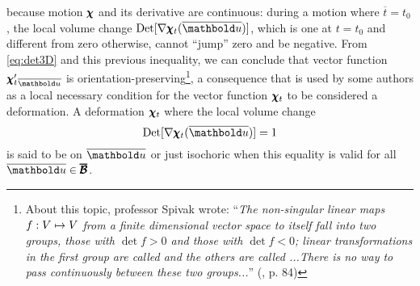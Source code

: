 because motion $\pmb{\chi}$ and its derivative are continuous: during a motion where $\overline{t}=t_0$, the local volume change $\textnormal{Det}[\fua{\nabla\tnr{\chi}_{t}}{\overline{\vto{u}}}]$, which is one at $t=t_0$ and different from zero otherwise, cannot ``jump'' zero and be negative. From \eqref{eq:det3D} and this previous inequality, we can conclude that vector function ${\tnr{\chi}'_t}_{\overline{\vto{u}}}$ is orientation-preserving\footnote{About this topic, professor Spivak wrote: ``\emph{The non-singular linear maps $f : V \mapsto V$ from a finite dimensional vector space to itself fall into two groups, those with $\det f>0$ and those with $\det f<0$; linear transformations in the first group are called  and the others are called ...There is no way to pass continuously between these two groups...}'' (\cite{spivak_2005_1}, p. 84)}, a consequence that is used by some authors as a local necessary condition for the vector function $\pmb{\chi}_t$ to be considered a deformation. A deformation  $\pmb{\chi}_t$ where the local volume change
\begin{equation}
\textnormal{Det}[\fua{\nabla\tnr{\chi}_t}{\overline{\vto{u}}}]=1
\end{equation}
is said to be  on $\overline{\vto{u}}$ or just isochoric when this equality is valid for all $\overline{\vto{u}}\in\tnr{\overline{\mathcal{B}}}$. 



